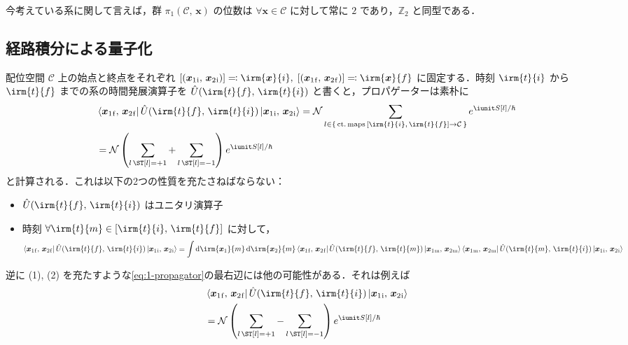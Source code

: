 \documentclass[TQFT_main]{subfiles}
\begin{document}
今考えている系に関して言えば，群 $\pi_1(\mathcal{C},\, \bm{x})$ の位数は $\forall \bm{x} \in \mathcal{C}$ に対して常に $2$ であり，$\mathbb{Z}_2$ と同型である．

\subsection{経路積分による量子化}

配位空間 $\mathcal{C}$ 上の始点と終点をそれぞれ $[(\bm{x}_1{}_{\mathrm{i}},\, \bm{x}_2{}_{\mathrm{i}})] \eqqcolon \irm{\bm{x}}{i},\; [(\bm{x}_1{}_{\mathrm{f}},\, \bm{x}_2{}_{\mathrm{f}})] \eqqcolon \irm{\bm{x}}{f}$ に固定する．時刻 $\irm{t}{i}$ から $\irm{t}{f}$ までの系の時間発展演算子を $\hat{U}(\irm{t}{f},\,\irm{t}{i})$ と書くと，プロパゲーターは素朴に
\begin{align}
    \label{eq:1-propagator}
    &\bra{\bm{x}_1{}_{\mathrm{f}},\, \bm{x}_2{}_{\mathrm{f}}} \hat{U}(\irm{t}{f},\, \irm{t}{i}) \ket{\bm{x}_1{}_{\mathrm{i}},\, \bm{x}_2{}_{\mathrm{i}}} = \mathcal{N} \sum_{l \in \{\, \mathrm{ct.\,maps}\, [\irm{t}{i},\, \irm{t}{f}] \to \mathcal{C}\, \}} e^{\iunit S[l]/\hbar} \\
    &= \mathcal{N} \left( \sum_{l\, \ST [l] = +1} + \sum_{l\, \ST [l] = -1} \right) e^{\iunit S[l]/\hbar} \label{eq:1-propagator-b}
\end{align}
と計算される．これは以下の2つの性質を充たさねばならない：
\begin{itemize}
    \item $\hat{U}(\irm{t}{f},\, \irm{t}{i})$ はユニタリ演算子
    \item 時刻 $\forall \irm{t}{m} \in [\irm{t}{i},\, \irm{t}{f}]$ に対して，
    \begin{align}
        \label{eq:1-composition}
        \bra{\bm{x}_1{}_{\mathrm{f}},\, \bm{x}_2{}_{\mathrm{f}}} \hat{U}(\irm{t}{f},\, \irm{t}{i}) \ket{\bm{x}_1{}_{\mathrm{i}},\, \bm{x}_2{}_{\mathrm{i}}} = \int \dd{\irm{\bm{x}_1}{m}}\dd{\irm{\bm{x}_2}{m}} \bra{\bm{x}_1{}_{\mathrm{f}},\, \bm{x}_2{}_{\mathrm{f}}} \hat{U}(\irm{t}{f},\, \irm{t}{m}) \ket{\bm{x}_1{}_{\mathrm{m}},\, \bm{x}_2{}_{\mathrm{m}}} \bra{\bm{x}_1{}_{\mathrm{m}},\, \bm{x}_2{}_{\mathrm{m}}} \hat{U}(\irm{t}{m},\, \irm{t}{i}) \ket{\bm{x}_1{}_{\mathrm{i}},\, \bm{x}_2{}_{\mathrm{i}}}
    \end{align}
\end{itemize}
逆に (1), (2) を充たすような\eqref{eq:1-propagator}の最右辺には他の可能性がある．それは例えば
\begin{align}
    &\bra{\bm{x}_1{}_{\mathrm{f}},\, \bm{x}_2{}_{\mathrm{f}}} \hat{U}(\irm{t}{f},\, \irm{t}{i}) \ket{\bm{x}_1{}_{\mathrm{i}},\, \bm{x}_2{}_{\mathrm{i}}}\\
    &= \mathcal{N} \left( \sum_{l\, \ST [l] = +1} - \sum_{l\, \ST [l] = -1} \right) e^{\iunit S[l]/\hbar} \label{eq:1-propagator-f}
\end{align}
\end{document}
